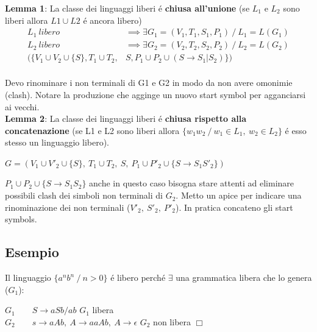 \textbf{Lemma 1}: La classe dei linguaggi liberi \'e \textbf{chiusa all'unione} 
(se $L_1$ e $L_2$ sono liberi allora $L1 \cup L2$ \'e ancora libero)
\begin{equation}\begin{split}
	L_1\ libero\ & \implies \exists G_1=(V_1,T_1,S_1,P_1)\ / \ L_1 = L(G_1)\\
	L_2\ libero\ & \implies \exists G_2=(V_2,T_2,S_2,P_2)\ / \ L_2 = L(G_2)\\
	(\{ V_1 \cup V_2 \cup \{ S \},T_1 \cup T_2, & S,P_1 \cup P_2 \cup (S \rightarrow S_1|S_2) \})\\
\end{split}\end{equation} 

Devo rinominare i non terminali di G1 e G2 in modo da non avere omonimie (clash). 
Notare la produzione che agginge un nuovo start symbol per agganciarsi ai vecchi.\\[5pt]

\textbf{Lemma 2}: La classe dei linguaggi liberi \'e \textbf{chiusa rispetto alla concatenazione}
(se L1 e L2 sono liberi allora 
$\{w_1w_2 \ / \ w_1 \in L_1,\ w_2 \in L_2 \}$ \'e esso stesso un linguaggio libero).
\begin{center}
	$G = (V_1 \cup V'_2 \cup \{ S \},\ T_1 \cup T_2,\ S,\ P_1 \cup P'_2 \cup \{ S \rightarrow S_1S'_2\} )$
\end{center}

$P_1 \cup P_2 \cup \{ S \rightarrow S_1 S_2 \}$ anche in questo caso bisogna stare attenti ad eliminare possibili clash dei simboli non terminali di $G_2$. Metto un apice per indicare una rinominazione dei non terminali ($V'_2,\ S'_2,\ P'_2$). In pratica concateno gli start symbols.

\subsection{Esempio}
Il linguaggio $\{ a^nb^n\ / \ n > 0 \}$ \'e libero perch\'e $\exists$ una grammatica libera che lo genera ($G_1$):\\
\begin{center}
	$G_1\qquad S\rightarrow aSb/ab$ $G_1$ libera\\
	$G_2\qquad s\rightarrow aAb,\ A\rightarrow aaAb,\ A\rightarrow \epsilon$ $G_2$ non libera $\Box$\\
\end{center}   

